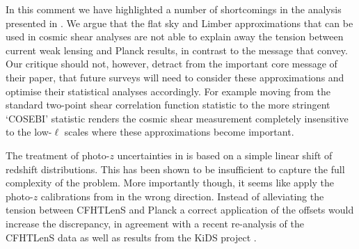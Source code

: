 In this comment we have highlighted a number of shortcomings in the analysis presented in \cite{kitching/etal:2016}.  We argue that the flat sky and Limber approximations that can be used in cosmic shear analyses are not able to explain away the tension between current weak lensing and Planck results, in contrast to the message that \cite{kitching/etal:2016} convey.  Our critique should not, however, detract from the important core message of their paper, that future surveys will need to consider these approximations and optimise their statistical analyses accordingly.  For example moving from the standard two-point shear correlation function statistic to the more stringent `COSEBI' statistic \citep{schneider/etal:2010} renders the cosmic shear measurement completely insensitive to the low-$\ell$ scales where these approximations become important.  

The treatment of photo-$z$ uncertainties in \cite{kitching/etal:2016} is based on a simple linear shift of redshift distributions. This has been shown to be insufficient to capture the full complexity of the problem. More importantly though, it seems like \cite{kitching/etal:2016} apply the photo-$z$ calibrations from \cite{choi/etal:2016} in the wrong direction. Instead of alleviating the tension between CFHTLenS and Planck a correct application of the offsets would increase the discrepancy, in agreement with a recent re-analysis of the CFHTLenS data \citep{joudaki/etal:2016} as well as results from the KiDS project \citep{hildebrandt/etal:2016}.